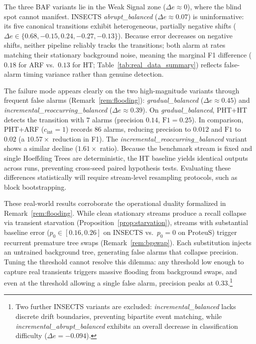 \documentclass[10pt,conference]{IEEEtran}
\theoremstyle{definition}
\begin{document}
The three BAF variants lie in the Weak Signal zone ($\Delta e \approx 0$), where the blind spot cannot manifest. INSECTS \emph{abrupt\_balanced} ($\Delta e \approx 0.07$) is uninformative: its five canonical transitions exhibit heterogeneous, partially negative shifts ($\Delta e \in \{0.68, -0.15, 0.24, -0.27, -0.13\}$). Because error decreases on negative shifts, neither pipeline reliably tracks the transitions; both alarm at rates matching their stationary background noise, meaning the marginal F1 difference ($0.18$ for ARF vs.\ $0.13$ for HT; Table~\ref{tab:real_data_summary}) reflects false-alarm timing variance rather than genuine detection.

The failure mode appears clearly on the two high-magnitude variants through frequent false alarms (Remark~\ref{rem:flooding}): \emph{gradual\_balanced} ($\Delta e \approx 0.45$) and \emph{incremental\_reoccurring\_balanced} ($\Delta e \approx 0.39$). On \emph{gradual\_balanced}, PHT+HT detects the transition with $7$ alarms (precision $0.14$, $\mathrm{F1} = 0.25$). In comparison, PHT+ARF ($c_{\mathrm{int}}=1$) records $86$ alarms, reducing precision to $0.012$ and $\mathrm{F1}$ to $0.02$ (a $10.57\times$ reduction in F1). The \emph{incremental\_reoccurring\_balanced} variant shows a similar decline ($1.61\times$ ratio). Because the benchmark stream is fixed and single Hoeffding Trees are deterministic, the HT baseline yields identical outputs across runs, preventing cross-seed paired hypothesis tests. Evaluating these differences statistically will require stream-level resampling protocols, such as block bootstrapping.

These real-world results corroborate the operational duality formalized in Remark~\ref{rem:flooding}. While clean stationary streams produce a recall collapse via transient starvation (Proposition~\ref{prop:starvation}), streams with substantial baseline error ($p_0 \in [0.16, 0.26]$ on INSECTS vs.\ $p_0 = 0$ on ProteuS) trigger recurrent premature tree swaps (Remark~\ref{rem:bgswap}). Each substitution injects an untrained background tree, generating false alarms that collapse precision. Tuning the threshold cannot resolve this dilemma: any threshold low enough to capture real transients triggers massive flooding from background swaps, and even at the threshold allowing a single false alarm, precision peaks at $0.33$.\footnote{Two further INSECTS variants are excluded: \emph{incremental\_balanced} lacks discrete drift boundaries, preventing bipartite event matching, while \emph{incremental\_abrupt\_balanced} exhibits an overall decrease in classification difficulty ($\Delta e = -0.094$).}
\end{document}
